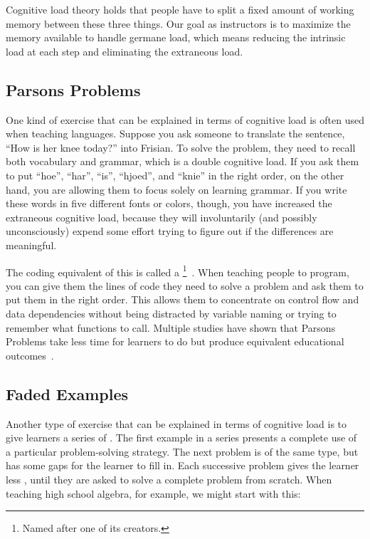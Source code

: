 Cognitive load theory holds that people have to split a fixed amount of working memory between these three things.
Our goal as instructors is to maximize the memory available to handle germane load,
which means reducing the intrinsic load at each step and eliminating the extraneous load.

\subsection*{Parsons Problems}

One kind of exercise that can be explained in terms of cognitive load
is often used when teaching languages.
Suppose you ask someone to translate the sentence, ``How is her knee today?'' into Frisian.
To solve the problem,
they need to recall both vocabulary and grammar,
which is a double cognitive load.
If you ask them to put ``hoe'', ``har'', ``is'', ``hjoed'', and ``knie'' in the right order,
on the other hand,
you are allowing them to focus solely on learning grammar.
If you write these words in five different fonts or colors,
though,
you have increased the extraneous cognitive load,
because they will involuntarily (and possibly unconsciously) expend some effort
trying to figure out if the differences are meaningful.

The coding equivalent of this
is called a \footnote{Named after one of its creators.}~\cite{Pars2006}.
When teaching people to program,
you can give them the lines of code they need to solve a problem
and ask them to put them in the right order.
This allows them to concentrate on control flow and data dependencies
without being distracted by variable naming or trying to remember what functions to call.
Multiple studies have shown that Parsons Problems take less time for learners to do
but produce equivalent educational outcomes~\cite{Eric2017}.

\subsection*{Faded Examples}

Another type of exercise that can be explained in terms of cognitive load
is to give learners a series of .
The first example in a series presents a complete use of a particular problem-solving strategy.
The next problem is of the same type,
but has some gaps for the learner to fill in.
Each successive problem gives the learner less ,
until they are asked to solve a complete problem from scratch.
When teaching high school algebra,
for example,
we might start with this:

